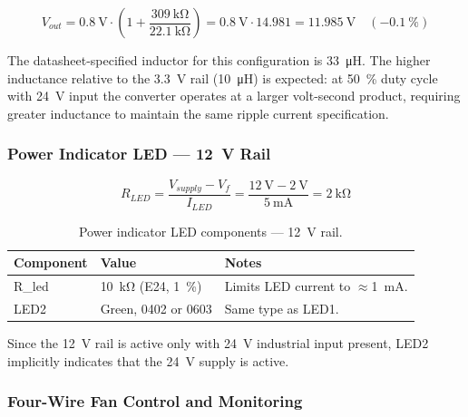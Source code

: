 \begin{equation}
  V_{out} = \SI{0.8}{\volt} \cdot \left(1 + \frac{\SI{309}{\kilo\ohm}}{\SI{22.1}{\kilo\ohm}}\right)
          = \SI{0.8}{\volt} \cdot 14.981 = \SI{11.985}{\volt} \quad (-\SI{0.1}{\percent})
  \label{eq:vout_12v}
\end{equation}

The datasheet-specified inductor for this configuration is \SI{33}{\micro\henry}.
The higher inductance relative to the \SI{3.3}{\volt} rail (\SI{10}{\micro\henry}) is expected: at \SI{50}{\percent} duty cycle with \SI{24}{\volt} input the converter operates at a larger volt-second product, requiring greater inductance to maintain the same ripple current specification.

\subsubsection{Power Indicator \ac{LED} — \SI{12}{\volt} Rail}
\label{sec:power_led_12v}

\begin{equation}
  R_{LED} = \frac{V_{supply} - V_f}{I_{LED}}
          = \frac{\SI{12}{\volt} - \SI{2}{\volt}}{\SI{5}{\milli\ampere}}
          = \SI{2}{\kilo\ohm}
  \label{eq:rled_12v}
\end{equation}

\begin{table}[H]
  \caption{Power indicator \ac{LED} components — \SI{12}{\volt} rail.}
  \label{tab:led_12v}
  \centering
  \begin{tabularx}{\textwidth}{|X|X|X|}
    \hline
    \textbf{Component} & \textbf{Value} & \textbf{Notes} \\ \hline \hline
    R\_led & \SI{10}{\kilo\ohm} (E24, \SI{1}{\percent}) & Limits \ac{LED} current to $\approx$\SI{1}{\milli\ampere}. \\ \hline
    LED2   & Green, 0402 or 0603 & Same type as LED1. \\ \hline
  \end{tabularx}
\end{table}

Since the \SI{12}{\volt} rail is active only with \SI{24}{\volt} industrial input present, LED2
implicitly indicates that the \SI{24}{\volt} supply is active.

\subsubsection{Four-Wire Fan Control and Monitoring}
\label{sec:fan_control}


